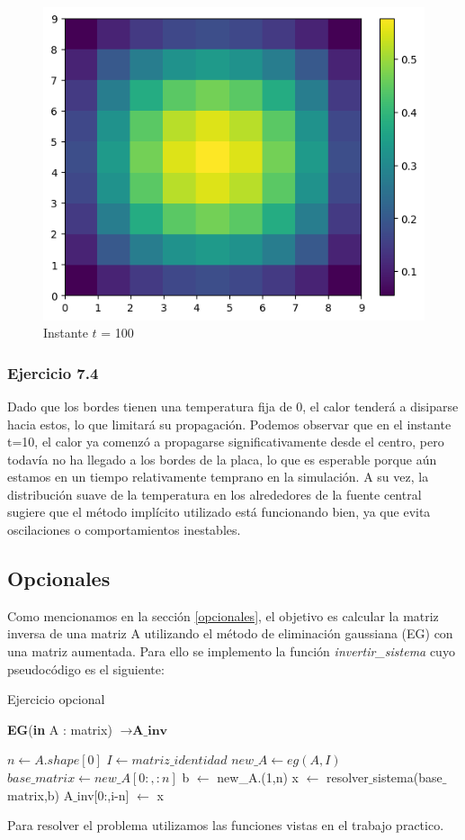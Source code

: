 \begin{figure}[!htb]
\begin{minipage}[b]{0.5\linewidth}
  \end{minipage}%
  \begin{minipage}[b]{0.5\linewidth}
    \centering
    \includegraphics[width=.5\linewidth]{./img/instante100.png}
  \caption{Instante $t$ = 100}\label{instante100}
    \vspace{4ex}
  \end{minipage} 
\end{figure}

\subsubsection{Ejercicio 7.4}
Dado que los bordes tienen una temperatura fija de 0, el calor tenderá a disiparse hacia estos, lo que limitará su propagación.
Podemos observar que en el instante t=10, el calor ya comenzó a propagarse significativamente desde el centro, pero todavía no ha llegado a los bordes de la placa, lo que es esperable porque aún estamos en un tiempo relativamente temprano en la simulación. A su vez, la distribución suave de la temperatura en los alrededores de la fuente central sugiere que el método implícito utilizado está funcionando bien, ya que evita oscilaciones o comportamientos inestables.

 \subsection{Opcionales}

 Como mencionamos en la sección \ref{opcionales}, el objetivo es calcular la matriz inversa de una matriz A utilizando el método de eliminación gaussiana (EG) con una matriz aumentada. Para ello se implemento la función \textit{invertir\_sistema} cuyo pseudocódigo es el siguiente: 
 
 \begin{algorithm}
\caption{Ejercicio opcional}\label{EG_SinP}
\begin{algorithmic}
\State \textbf{EG}(\textbf{in} A : matrix) $\to \textbf{A\_inv}$
 
 \State $n \gets A.shape[0]$
 \State $I \gets matriz\_identidad$
 \State $new\_A \gets eg(A,I)$
 \State $base\_matrix \gets new\_A[0:,:n]$
        \State  b $\gets$ new\_A.(1,n)
        \State x $\gets$ resolver$\_$sistema(base$\_$matrix,b)
        \State A$\_$inv[0:,i-n] $\gets$ x
\EndFor
{}
\end{algorithmic}
\end{algorithm}

Para resolver el problema utilizamos las funciones vistas en el trabajo practico.